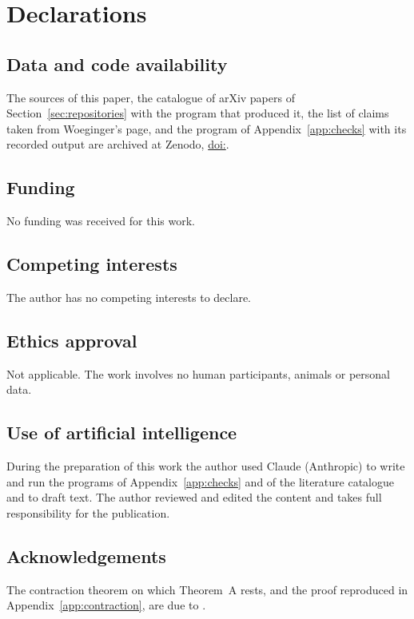
\section*{Declarations}

\subsection*{Data and code availability}
The sources of this paper, the catalogue of arXiv papers of
Section~\ref{sec:repositories} with the program that produced it, the list of
claims taken from Woeginger's page, and the program of
Appendix~\ref{app:checks} with its recorded output are archived at Zenodo,
\href{https://doi.org/\zenodoDOI}{doi:\zenodoDOI}.

\subsection*{Funding}
No funding was received for this work.

\subsection*{Competing interests}
The author has no competing interests to declare.

\subsection*{Ethics approval}
Not applicable. The work involves no human participants, animals or personal
data.

\subsection*{Use of artificial intelligence}
During the preparation of this work the author used Claude (Anthropic) to write
and run the programs of Appendix~\ref{app:checks} and of the literature
catalogue and to draft text. The author reviewed and edited the content and
takes full responsibility for the publication.

\subsection*{Acknowledgements}
The contraction theorem on which Theorem~A rests, and the proof reproduced in
Appendix~\ref{app:contraction}, are due to \oai{} \cite{OAI26}.

\FloatBarrier
